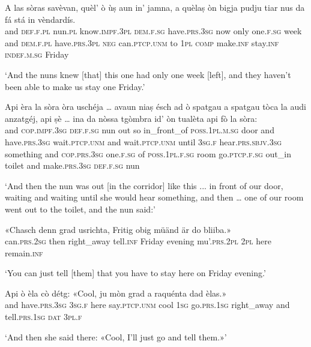 \begin{linenumbers}
\gll    A las sòras savèvan, quèl’ ò ùṣ aun in’ jamna, a quèlaṣ òn bigja pudju tiar nus da fá stá in vèndardís.\\
and \textsc{def.f.pl} nun.\textsc{pl} know.\textsc{impf.3pl} \textsc{dem.f.sg} have.\textsc{prs.3sg} now only one.\textsc{f.sg} week and \textsc{dem.f.pl} have.\textsc{prs.3pl} \textsc{neg} can.\textsc{ptcp.unm} to \textsc{1pl} \textsc{comp} make.\textsc{inf} stay.\textsc{inf} \textsc{indef.m.sg} Friday\\
\end{linenumbers}
\medskip
\glt `And the nuns knew [that] this one had only one week [left], and they haven’t been able to make us stay one Friday.'
\medskip

\begin{linenumbers}
\gll    Api èra la sòra òra uschéja … avaun niaṣ ésch ad ò spatgau a spatgau tòca la audi anzatgéj, api ṣè …  ina da nòssa tgòmbra id’ òn tualèta api fò la sòra:\\
and \textsc{cop.impf.3sg} \textsc{def.f.sg} nun out so {} in\_front\_of \textsc{poss.1pl.m.sg} door and have.\textsc{prs.3sg} wait.\textsc{ptcp.unm} and wait.\textsc{ptcp.unm} until \textsc{3sg.f} hear.\textsc{prs.sbjv.3sg} something and \textsc{cop.prs.3sg} {} one.\textsc{f.sg} of \textsc{poss.1pl.f.sg} room go.\textsc{ptcp.f.sg} out\_in toilet and make.\textsc{prs.3sg} \textsc{def.f.sg} nun\\
\end{linenumbers}
\medskip
\glt `And then the nun was out [in the corridor] like this ... in front of our door, waiting and waiting until she would hear something, and then … one of our room went out to the toilet, and the nun said:'
\medskip

\begin{linenumbers}
\gll   «Chasch denn grad usrichta, Fritig obig müänd är do bliiba.\footnotemark» \\
 can.\textsc{prs.2sg} then right\_away tell.\textsc{inf} Friday evening mu'.\textsc{prs.2pl} \textsc{2pl} here remain.\textsc{inf}   \\
\end{linenumbers}
\medskip
\glt `You can just tell [them] that you have to stay here on Friday evening.'
\medskip

\begin{linenumbers}
\gll    Api ò èla cò détg: «Cool, ju mòn grad a raquénta dad èlas.»\\
and have.\textsc{prs.3sg} \textsc{3sg.f} here say.\textsc{ptcp.unm} cool \textsc{1sg}  go.\textsc{prs.1sg} right\_away and tell.\textsc{prs.1sg} \textsc{dat} \textsc{3pl.f} \\
\end{linenumbers}
\medskip
\glt `And then she said there: «Cool, I’ll just go and tell them.»'
\medskip

